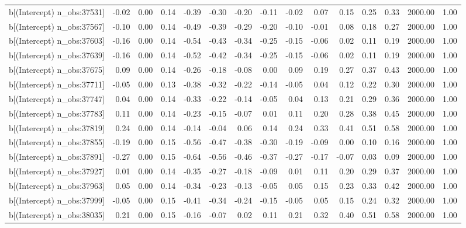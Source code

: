 \begin{table}[ht]
\begin{tabular}{rrrrrrrrrrrrrrr}
  b[(Intercept) n\_obs:37531] & -0.02 & 0.00 & 0.14 & -0.39 & -0.30 & -0.20 & -0.11 & -0.02 & 0.07 & 0.15 & 0.25 & 0.33 & 2000.00 & 1.00 \\ 
  b[(Intercept) n\_obs:37567] & -0.10 & 0.00 & 0.14 & -0.49 & -0.39 & -0.29 & -0.20 & -0.10 & -0.01 & 0.08 & 0.18 & 0.27 & 2000.00 & 1.00 \\ 
  b[(Intercept) n\_obs:37603] & -0.16 & 0.00 & 0.14 & -0.54 & -0.43 & -0.34 & -0.25 & -0.15 & -0.06 & 0.02 & 0.11 & 0.19 & 2000.00 & 1.00 \\ 
  b[(Intercept) n\_obs:37639] & -0.16 & 0.00 & 0.14 & -0.52 & -0.42 & -0.34 & -0.25 & -0.15 & -0.06 & 0.02 & 0.11 & 0.19 & 2000.00 & 1.00 \\ 
  b[(Intercept) n\_obs:37675] & 0.09 & 0.00 & 0.14 & -0.26 & -0.18 & -0.08 & 0.00 & 0.09 & 0.19 & 0.27 & 0.37 & 0.43 & 2000.00 & 1.00 \\ 
  b[(Intercept) n\_obs:37711] & -0.05 & 0.00 & 0.13 & -0.38 & -0.32 & -0.22 & -0.14 & -0.05 & 0.04 & 0.12 & 0.22 & 0.30 & 2000.00 & 1.00 \\ 
  b[(Intercept) n\_obs:37747] & 0.04 & 0.00 & 0.14 & -0.33 & -0.22 & -0.14 & -0.05 & 0.04 & 0.13 & 0.21 & 0.29 & 0.36 & 2000.00 & 1.00 \\ 
  b[(Intercept) n\_obs:37783] & 0.11 & 0.00 & 0.14 & -0.23 & -0.15 & -0.07 & 0.01 & 0.11 & 0.20 & 0.28 & 0.38 & 0.45 & 2000.00 & 1.00 \\ 
  b[(Intercept) n\_obs:37819] & 0.24 & 0.00 & 0.14 & -0.14 & -0.04 & 0.06 & 0.14 & 0.24 & 0.33 & 0.41 & 0.51 & 0.58 & 2000.00 & 1.00 \\ 
  b[(Intercept) n\_obs:37855] & -0.19 & 0.00 & 0.15 & -0.56 & -0.47 & -0.38 & -0.30 & -0.19 & -0.09 & 0.00 & 0.10 & 0.16 & 2000.00 & 1.00 \\ 
  b[(Intercept) n\_obs:37891] & -0.27 & 0.00 & 0.15 & -0.64 & -0.56 & -0.46 & -0.37 & -0.27 & -0.17 & -0.07 & 0.03 & 0.09 & 2000.00 & 1.00 \\ 
  b[(Intercept) n\_obs:37927] & 0.01 & 0.00 & 0.14 & -0.35 & -0.27 & -0.18 & -0.09 & 0.01 & 0.11 & 0.20 & 0.29 & 0.37 & 2000.00 & 1.00 \\ 
  b[(Intercept) n\_obs:37963] & 0.05 & 0.00 & 0.14 & -0.34 & -0.23 & -0.13 & -0.05 & 0.05 & 0.15 & 0.23 & 0.33 & 0.42 & 2000.00 & 1.00 \\ 
  b[(Intercept) n\_obs:37999] & -0.05 & 0.00 & 0.15 & -0.41 & -0.34 & -0.24 & -0.15 & -0.05 & 0.05 & 0.15 & 0.24 & 0.32 & 2000.00 & 1.00 \\ 
  b[(Intercept) n\_obs:38035] & 0.21 & 0.00 & 0.15 & -0.16 & -0.07 & 0.02 & 0.11 & 0.21 & 0.32 & 0.40 & 0.51 & 0.58 & 2000.00 & 1.00 \\ 

\end{tabular}
\end{table}
